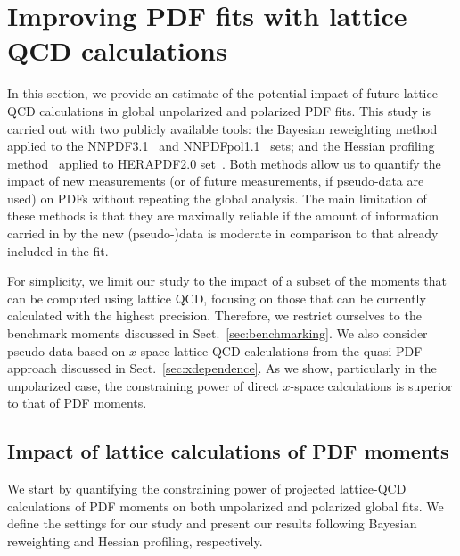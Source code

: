 \section{Improving PDF fits with lattice QCD calculations}
\label{sec:projections}

In this section, we provide an estimate of the potential
impact of future lattice-QCD calculations
in global unpolarized and polarized PDF fits.
%
This study is carried out with two publicly available
tools: the Bayesian reweighting
method~\cite{Ball:2011gg,Ball:2010gb} applied to the
NNPDF3.1~\cite{Ball:2017nwa} and NNPDFpol1.1~\cite{Nocera:2014gqa} sets; 
and the Hessian profiling method~\cite{Camarda:2015zba} applied to
HERAPDF2.0 set~\cite{Abramowicz:2015mha}.
%
Both methods allow us to quantify the impact of new measurements
(or of future measurements, if pseudo-data are used) on PDFs without
repeating the global analysis.
%
The main limitation of these methods is that they are maximally reliable
if the amount of information carried in by the new (pseudo-)data is moderate
in comparison to that already included in the fit.

For simplicity, we limit our study to the impact of a subset of the moments 
that can be computed using lattice QCD, focusing on those that can be 
currently calculated with the highest precision.
%
Therefore, we restrict ourselves to the benchmark moments discussed in 
Sect.~\ref{sec:benchmarking}.
%
We also consider pseudo-data based on $x$-space
lattice-QCD calculations from the quasi-PDF approach
discussed in Sect.~\ref{sec:xdependence}.
%
As we show, particularly in the unpolarized case, the
constraining power of direct $x$-space calculations is
superior to that of PDF moments.

\subsection{Impact of lattice calculations of PDF moments}

We start by quantifying the constraining power of projected lattice-QCD 
calculations of PDF moments on both unpolarized and polarized global fits.
%
We define the settings for our study and present our results following
Bayesian reweighting and Hessian profiling, respectively.











